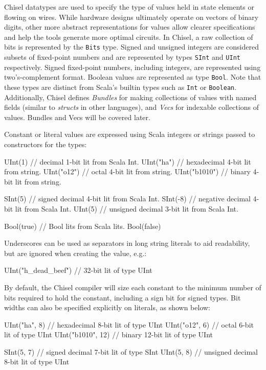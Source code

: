 \documentclass[twocolumn,10pt]{article}
\def\code#1{{\tt #1}}
\begin{document}
Chisel datatypes are used to specify the type of values held in state
elements or flowing on wires.  While hardware designs ultimately
operate on vectors of binary digits, other more abstract
representations for values allow clearer specifications and help the
tools generate more optimal circuits.  In Chisel, a raw collection of
bits is represented by the \code{Bits} type.  Signed and unsigned integers
are considered subsets of fixed-point numbers and are represented by
types \code{SInt} and \code{UInt} respectively. Signed fixed-point
numbers, including integers, are represented using two's-complement
format.  Boolean values are represented as type \code{Bool}.  Note
that these types are distinct from Scala's builtin types such as
\code{Int} or \code{Boolean}.  Additionally, Chisel defines {\em Bundles} for making
collections of values with named fields (similar to {\em structs} in
other languages), and {\em Vecs} for indexable collections of
values.  Bundles and Vecs will be covered later.

Constant or literal values are expressed using Scala integers or
strings passed to constructors for the types:
\begin{scala}
UInt(1)       // decimal 1-bit lit from Scala Int.
UInt("ha")    // hexadecimal 4-bit lit from string.
UInt("o12")   // octal 4-bit lit from string.
UInt("b1010") // binary 4-bit lit from string.

SInt(5)    // signed decimal 4-bit lit from Scala Int.
SInt(-8)   // negative decimal 4-bit lit from Scala Int.
UInt(5)    // unsigned decimal 3-bit lit from Scala Int.

Bool(true) // Bool lits from Scala lits.
Bool(false)
\end{scala}

Underscores can be used as separators in long string literals to aid
readability, but are ignored when creating the value, e.g.:
\begin{scala}
UInt("h_dead_beef")   // 32-bit lit of type UInt
\end{scala}

By default, the Chisel compiler will size each constant to the minimum
number of bits required to hold the constant, including a sign bit for
signed types.  Bit widths can also be specified explicitly on
literals, as shown below:
\begin{scala}
UInt("ha", 8)     // hexadecimal 8-bit lit of type UInt
UInt("o12", 6)    // octal 6-bit lit of type UInt
UInt("b1010", 12) // binary 12-bit lit of type UInt

SInt(5, 7) // signed decimal 7-bit lit of type SInt
UInt(5, 8) // unsigned decimal 8-bit lit of type UInt
\end{scala}
\end{document}
